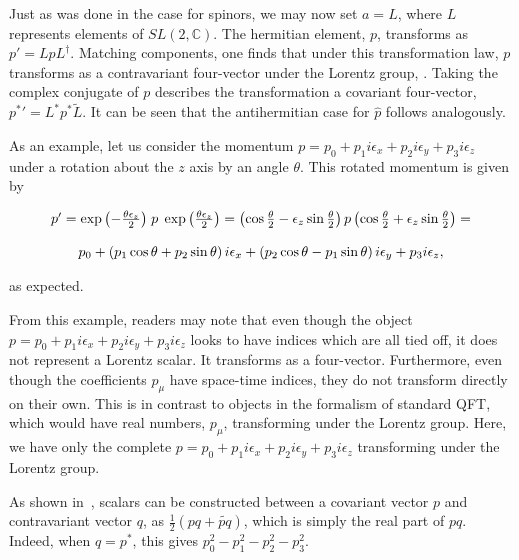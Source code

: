 \documentclass[letterpaper,12pt,titlepage,oneside,final]{book}
\begin{document}
Just as was done in the case for spinors, we may now set $a=L$, where $L$ represents elements of $SL(2, \mathbb{C})$.  The hermitian element, $p$, transforms as $p'= LpL^{\dagger}$.  Matching components, one finds that under this transformation law, $p$ transforms as a contravariant four-vector under the Lorentz group, \cite{gs}.  Taking the complex conjugate of $p$ describes the transformation a covariant four-vector,  ${p^*}'= L^*p^*\widetilde{L}$.  It can be seen that the antihermitian case for $\hat{p}$ follows analogously.

As an example, let us consider the momentum $p = p_0 + p_1i{\epsilon_x} +p_2i{\epsilon_y} + p_3i{\epsilon_z}$ under a rotation about the $z$ axis by an angle $\theta$.  This rotated momentum is given by

\begin{equation} \begin{array}{c}
p' =  \exp{\left(-\frac{\theta{\epsilon_z}}{2}\right)}\hspace{1mm}p\hspace{1mm} \exp{\left(\frac{\theta{\epsilon_z}}{2}\right)} = \left(  \cos{\frac{\theta}{2}} - {\epsilon_z}\sin{\frac{\theta}{2}}    \right) p \left(    \cos{ \frac{ \theta }{2} } + {\epsilon_z}\sin{\frac{\theta}{2}}   \right)=
\\ \\
p_0 + \left( p_1 \cos{\theta} + p_2 \sin{\theta}  \right) i{\epsilon_x} + \left(  p_2 \cos{\theta} - p_1 \sin{\theta} \right)i{\epsilon_y} + p_3i{\epsilon_z},
\end{array}\end{equation}

\noindent as expected. 

From this example, readers may note that even though the object $p = p_0 + p_1i{\epsilon_x} +p_2i{\epsilon_y} + p_3i{\epsilon_z}$ looks to have indices which are all tied off, it does not represent a Lorentz scalar.  It transforms as a four-vector.  Furthermore, even though the coefficients $p_{\mu}$ have space-time indices, they do not transform directly on their own.   This is in contrast to objects in the formalism of standard QFT, which would have real numbers, $p_{\mu}$, transforming under the Lorentz group.  Here, we have only the complete  $p = p_0 + p_1i{\epsilon_x} +p_2i{\epsilon_y} + p_3i{\epsilon_z}$ transforming under the Lorentz group.



 As shown in~\cite{gs}, scalars can be constructed  between a covariant vector $p$ and contravariant vector $q$, as $\frac{1}{2}\left( pq + \widetilde{pq} \right)$, which is simply the real part of $pq$.  Indeed, when $q=p^*$, this gives $p_0^2 -p_1^2-p_2^2-p_3^2$.
\end{document}
